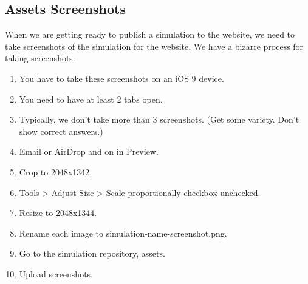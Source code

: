 \documentclass[titlepage]{article}
\begin{document}
	\subsection{Assets Screenshots}

When we are getting ready to publish a simulation to the website, we need to take screenshots of the simulation for the website. We have a bizarre process for taking screenshots.

		\begin{enumerate}
			\item You have to take these screenshots on an iOS 9 device.
			\item You need to have at least 2 tabs open.
			\item Typically, we don't take more than 3 screenshots. (Get some variety. Don't show correct answers.)
			\item Email or AirDrop and on in Preview.
			\item Crop to 2048x1342.
			\item Tools > Adjust Size > Scale proportionally checkbox unchecked.
			\item Resize to 2048x1344.
			\item Rename each image to simulation-name-screenshot.png.
			\item Go to the simulation repository, assets.
			\item Upload screenshots.
		\end{enumerate}
\end{document}
